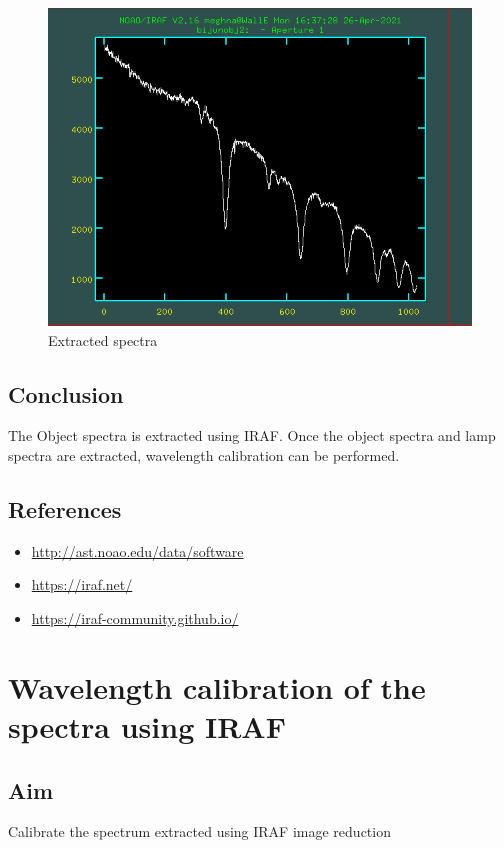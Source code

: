 \documentclass[letterpaper,11pt]{report}
\begin{document}
\begin{figure}[H]
    \centering
    \includegraphics[scale=0.4]{iraf/ijunobj.png}
    \caption{Extracted spectra}
    \label{fig:my_label}
\end{figure}

\section{Conclusion}
The Object spectra is extracted using IRAF. Once the object spectra and lamp spectra are extracted, wavelength
calibration can be performed.

\section{References}
\begin{itemize}
    \item \href{http://ast.noao.edu/data/software}{http://ast.noao.edu/data/software}
    \item \href{https://iraf.net/}{https://iraf.net/}
    \item \href{https://iraf-community.github.io/}{https://iraf-community.github.io/}
\end{itemize}






\chapter{Wavelength calibration of the spectra using IRAF}
\section{Aim}
Calibrate the spectrum extracted using IRAF image reduction
\end{document}
